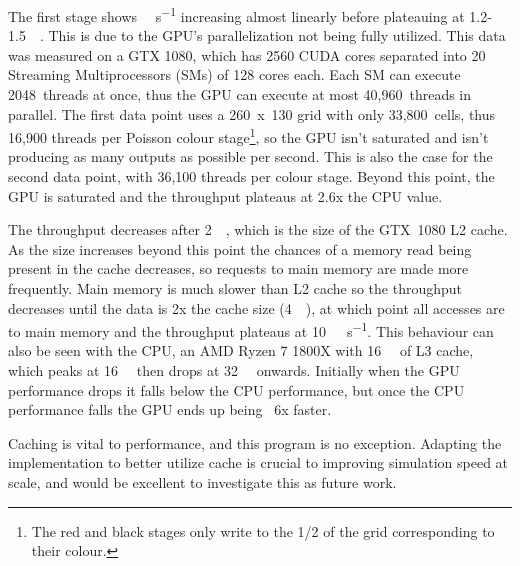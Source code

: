 The first stage shows \si{\giga\op\per\second} increasing almost linearly before plateauing at 1.2-\SI{1.5}{\mega\byte}.
This is due to the GPU's parallelization not being fully utilized.
This data was measured on a GTX 1080, which has 2560 CUDA cores separated into 20 Streaming Multiprocessors (SMs) of 128 cores each\cite{nvidia1080Whitepaper}.
Each SM can execute 2048~threads at once\cite{NvidiaCudaOccupancyCalc}, thus the GPU can execute at most 40,960~threads in parallel.
The first data point uses a 260~x~130 grid with only 33,800~cells, thus 16,900 threads per Poisson colour stage\footnote{The red and black stages only write to the 1/2 of the grid corresponding to their colour.}, so the GPU isn't saturated and isn't producing as many outputs as possible per second.
This is also the case for the second data point, with 36,100 threads per colour stage.
Beyond this point, the GPU is saturated and the throughput plateaus at 2.6x the CPU value.


The throughput decreases after \SI{2}{\mega\byte}, which is the size of the GTX~1080 L2 cache\cite{nvidia1080Whitepaper}.
As the size increases beyond this point the chances of a memory read being present in the cache decreases, so requests to main memory are made more frequently.
Main memory is much slower than L2 cache so the throughput decreases until the data is 2x the cache size (\SI{4}{\mega\byte}), at which point all accesses are to main memory and the throughput plateaus at \SI{10}{\giga\op\per\second}.
This behaviour can also be seen with the CPU, an AMD Ryzen 7 1800X with \SI{16}{\mega\byte} of L3 cache, which peaks at \SI{16}{\mega\byte} then drops at \SI{32}{\mega\byte} onwards.
Initially when the GPU performance drops it falls below the CPU performance, but once the CPU performance falls the GPU ends up being ~6x faster.

Caching is vital to performance, and this program is no exception.
Adapting the implementation to better utilize cache is crucial to improving simulation speed at scale, and would be excellent to investigate this as future work.

